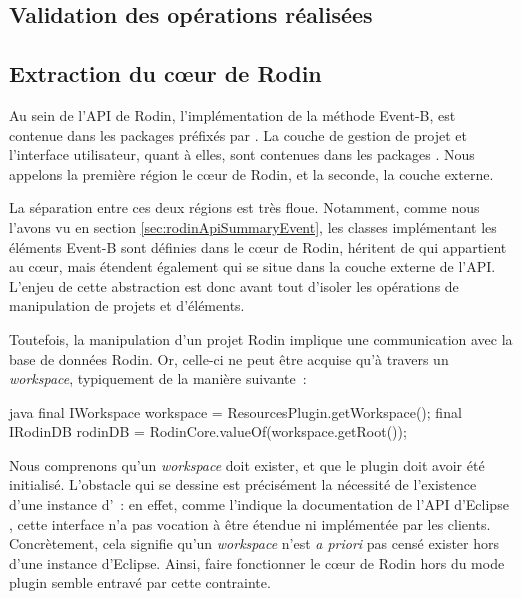 \subsection{Validation des opérations réalisées}


\subsection{Extraction du cœur de Rodin}

Au sein de l'API de Rodin, l'implémentation de la méthode Event-B, est contenue dans les packages préfixés par .
La couche de gestion de projet et l'interface utilisateur, quant à elles, sont contenues dans les packages .
Nous appelons la première région le cœur de Rodin, et la seconde, la couche externe.

La séparation entre ces deux régions est très floue.
Notamment, comme nous l'avons vu en section \ref{sec:rodinApiSummaryEvent}, les classes implémentant les éléments Event-B sont définies dans le cœur de Rodin, %
héritent de  qui appartient au cœur, mais étendent également  qui se situe dans la couche externe de l'API.
L'enjeu de cette abstraction est donc avant tout d'isoler les opérations de manipulation de projets et d'éléments.

Toutefois, la manipulation d'un projet Rodin implique une communication avec la base de données Rodin.
Or, celle-ci ne peut être acquise qu'à travers un \textit{workspace}, typiquement de la manière suivante~:

\begin{imtaCode}{java}
final IWorkspace workspace = ResourcesPlugin.getWorkspace();
final IRodinDB rodinDB = RodinCore.valueOf(workspace.getRoot());
\end{imtaCode}

Nous comprenons qu'un \textit{workspace} doit exister, et que le plugin  doit avoir été initialisé.
L'obstacle qui se dessine est précisément la nécessité de l'existence d'une instance d'~: en effet, comme l'indique la documentation %
de l'API d'Eclipse \cite{eclipseiworkspace}, cette interface n'a pas vocation à être étendue ni implémentée par les clients.
Concrètement, cela signifie qu'un \textit{workspace} n'est \textit{a priori} pas censé exister hors d'une instance d'Eclipse.
Ainsi, faire fonctionner le cœur de Rodin hors du mode plugin semble entravé par cette contrainte.

